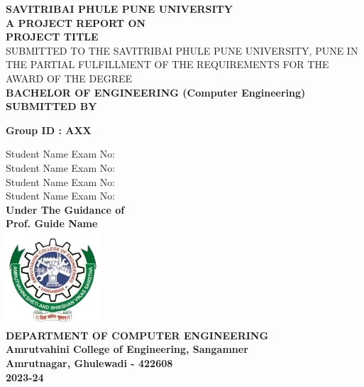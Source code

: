 \documentclass[oneside,a4paper,12pt]{report}
\begin{document}
\setlength{\parindent}{0mm}
\begin{center}
{\bfseries SAVITRIBAI PHULE PUNE UNIVERSITY \\}
 \vspace*{1\baselineskip}
{\bfseries A PROJECT REPORT ON \\}
 \vspace*{1\baselineskip}
{\bfseries \fontsize{16}{12} \selectfont PROJECT TITLE \\ \vspace*{2\baselineskip}}
{\fontsize{12}{12} \selectfont SUBMITTED TO THE SAVITRIBAI PHULE PUNE UNIVERSITY, PUNE
IN THE PARTIAL FULFILLMENT OF THE REQUIREMENTS 
FOR THE AWARD OF THE DEGREE \\
\vspace*{2\baselineskip}}
{\bfseries \fontsize{14}{12} \selectfont 
\hspace{18 mm}BACHELOR OF ENGINEERING
\newline(Computer Engineering) \\
\vspace*{1\baselineskip}} 
{\bfseries \fontsize{14}{12} \selectfont SUBMITTED BY \\ 
} 
\begin{center}
\bf{Group ID : AXX}
\end{center}
Student Name  \hspace{25 mm} Exam No:  \\
Student Name \hspace{25 mm} Exam No:   \\
Student Name \hspace{25 mm} Exam No:  \\
Student Name \hspace{25 mm} Exam No:\\
\vspace*{1\baselineskip}
{\bfseries \fontsize{14}{12} \selectfont Under The Guidance of \\  
\vspace*{1\baselineskip}} 
\bf{Prof. Guide Name}\\
\includegraphics[width=100pt]{AVCOE_LOGO.png} \\
{\bfseries \fontsize{14}{12} \selectfont DEPARTMENT OF COMPUTER ENGINEERING \\
Amrutvahini College of Engineering, Sangamner\\
Amrutnagar, Ghulewadi - 422608 \\
2023-24
}
\end{center}
\end{document}
